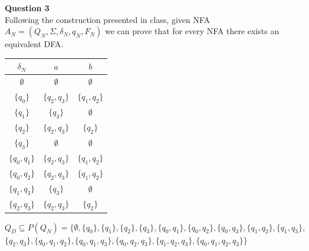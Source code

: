 \documentclass{article}
\begin{document}
\bigskip
{\bf Question 3}\\
Following the construction presented in class, given NFA $A_N = (Q_N,\Sigma,\delta_N,q_N,F_N)$ we can prove that for every NFA there exists an equivalent DFA.

\begin{center}
\begin{tabular}{||c c c||} 
 \hline
 $\delta_N$ & $a$ & $b$ \\ [0.5ex] 
 \hline\hline
 $\emptyset$ &  $\emptyset$ & $\emptyset$ \\
 \hline
 $\{q_0\}$ & $\{q_2,q_3\}$ & $\{q_1,q_2\}$ \\
 \hline
 $\{q_1\}$ & $\{q_3\}$ & $\emptyset$ \\
 \hline
 $\{q_2\}$ & $\{q_2,q_3\}$ & $\{q_2\}$ \\
 \hline
 $\{q_3\}$ & $\emptyset$ & $\emptyset$ \\
 \hline
 $\{q_0,q_1\}$ & $\{q_2,q_3\}$ & $\{q_1,q_2\}$ \\
 \hline
 $\{q_0,q_2\}$ & $\{q_2,q_3\}$ & $\{q_1,q_2\}$ \\
 \hline
 $\{q_1,q_3\}$ & $\{q_3\}$ & $\emptyset$ \\
 \hline
 $\{q_2,q_3\}$ & $\{q_2,q_3\}$ & $\{q_2\}$ \\
 \hline
 \hline
\end{tabular}
\end{center}



$Q_D\subseteq P(Q_N)=\{\emptyset, \{q_0\},\{q_1\},\{q_2\},\{q_3\}, \{q_0,q_1\}, \{q_0, q_2\}, \{q_0, q_3\}, \{q_1, q_2\}, \{q_1, q_3\},$\\ $\{q_2, q_3\}, \{q_0, q_1, q_2\}, \{q_0, q_1, q_3\}, \{q_0, q_2, q_3\}, \{q_1, q_2, q_3\}, \{q_0, q_1, q_2, q_3\}\}$\\

\end{document}
